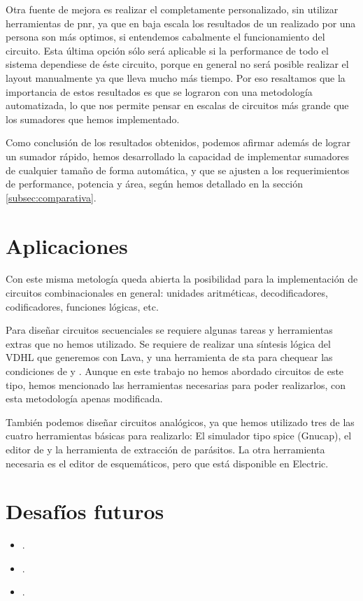Otra fuente de mejora es realizar el \layout completamente personalizado, sin utilizar herramientas de \gls{pnr}, ya que en baja escala los resultados de un \layout realizado por una persona son más optimos, si entendemos cabalmente el funcionamiento del circuito. Esta última opción sólo será aplicable si la performance de todo el sistema dependiese de éste circuito, porque en general no será posible realizar el layout manualmente ya que lleva mucho más tiempo. Por eso resaltamos que la importancia de estos resultados es que se lograron con una metodología automatizada, lo que nos permite pensar en escalas de circuitos más grande que los sumadores que hemos implementado.

Como conclusión de los resultados obtenidos, podemos afirmar además de lograr un sumador rápido, hemos desarrollado la capacidad de implementar sumadores de cualquier tamaño de forma automática, y que se ajusten a los requerimientos de performance, potencia y área,  según hemos detallado en la sección \ref{subsec:comparativa}.


\section{Aplicaciones}

Con este misma metología queda abierta la posibilidad para la implementación de circuitos combinacionales en general: unidades aritméticas, decodificadores, codificadores, funciones lógicas, etc. 

Para diseñar circuitos secuenciales se requiere algunas tareas y herramientas extras que no hemos utilizado. Se requiere de realizar una síntesis lógica del VDHL que generemos con Lava, y una herramienta de \gls{sta} para chequear las condiciones de  y . Aunque en este trabajo no hemos abordado circuitos de este tipo, hemos mencionado las herramientas necesarias para poder realizarlos, con esta metodología apenas modificada.

También podemos diseñar circuitos analógicos, ya que hemos utilizado tres de las cuatro herramientas básicas para realizarlo: El simulador tipo spice (Gnucap), el editor de \layout y la herramienta de extracción de parásitos. La otra herramienta necesaria es el editor de esquemáticos, pero que está disponible en Electric.

\section{Desafíos futuros}
\begin{itemize}
\item .
\item .
\item .
\end{itemize}






